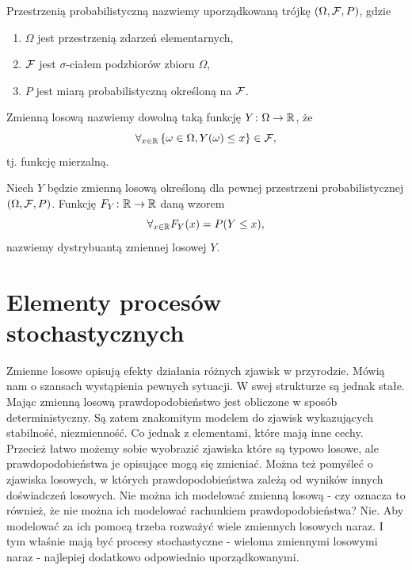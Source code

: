 \documentclass[10pt,a4paper]{book}
\begin{document}
\begin{definition}
Przestrzenią probabilistyczną nazwiemy uporządkowaną trójkę $ {\left( {\Omega, \mathcal{F}, P} \right)} $, gdzie
\begin{enumerate}
\item $\Omega$  jest przestrzenią zdarzeń elementarnych,
\item $\mathcal{F}$ jest $\sigma$-ciałem podzbiorów zbioru $\Omega$,
\item $P$ jest miarą probabilistyczną określoną na $\mathcal{F}$.
\end{enumerate}
\end{definition}

\begin{definition}
Zmienną losową nazwiemy dowolną taką funkcję $Y \colon \Omega \to \mathbb{R}$, że
$$
\forall_{x \in \mathbb{R} } \left\lbrace { \omega \in \Omega, Y(\omega) \leq x} \right\rbrace \in \mathcal{F},
$$
tj. funkcję mierzalną.
\end{definition}

\begin{definition}[Dystrybuanta]
Niech $Y$ będzie zmienną losową określoną dla pewnej przestrzeni probabilistycznej ${\left( {\Omega,\mathcal{F},P} \right)}$. Funkcję $F_Y \colon \mathbb{R} \to \mathbb{R}$ daną wzorem
$$
\forall_{x \in \mathbb{R} } F_Y(x) = P(Y \leq x),
$$
nazwiemy dystrybuantą zmiennej losowej $Y$.
\end{definition}

\section{Elementy procesów stochastycznych}

Zmienne losowe opisują efekty działania różnych zjawisk w przyrodzie. Mówią nam o szansach wystąpienia pewnych sytuacji. W swej strukturze są jednak stałe. Mając zmienną losową prawdopodobieństwo jest obliczone w sposób deterministyczny. Są zatem znakomitym modelem do zjawisk wykazujących stabilność, niezmienność. Co jednak z elementami, które mają inne cechy. Przecież łatwo możemy sobie wyobrazić zjawiska które są typowo losowe, ale prawdopodobieństwa je opisujące mogą się zmieniać. Można też pomyśleć o zjawiska losowych, w których prawdopodobieństwa zależą od wyników innych doświadczeń losowych. Nie można ich modelować zmienną losową - czy oznacza to również, że nie można ich modelować rachunkiem prawdopodobieństwa? Nie. Aby modelować za ich pomocą trzeba rozważyć wiele zmiennych losowych naraz. I tym właśnie mają być procesy stochastyczne - wieloma zmiennymi losowymi naraz - najlepiej dodatkowo odpowiednio uporządkowanymi.
\end{document}
